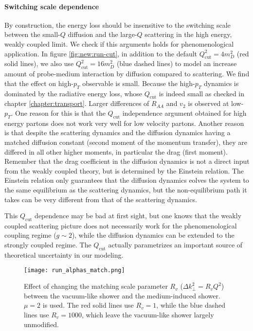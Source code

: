 \paragraph{Switching scale dependence} By construction, the energy loss should be insensitive to the switching scale between the small-$Q$ diffusion and the large-$Q$ scattering in the high energy, weakly coupled limit.
We check if this arguments holds for phenomenological application.
In figure \ref{fig:new:run-cut}, in addition to the default $Q_\textrm{cut}^2 = 4 m_D^2$ (red solid lines), we also use $Q_\textrm{cut}^2 = 16 m_D^2$ (blue dashed lines) to model an increase amount of probe-medium interaction by diffusion compared to scattering.
We find that the effect on high-$p_T$ observable is small.
Because the high-$p_T$ dynamics is dominated by the radiative energy loss, whose $Q_\textrm{cut}$ is indeed small as checked in chapter \ref{chapter:transport}.
Larger differences of $R_{AA}$ and $v_2$ is observed at low-$p_T$.
One reason for this is that the $Q_\textrm{cut}$ independence argument obtained for high energy partons does not work very well for low velocity partons.
Another reason is that despite the scattering dynamics and the diffusion dynamics having a matched diffusion constant (second moment of the momentum transfer), they are differed in all other higher moments, in particular the drag (first moment).
Remember that the drag coefficient in the diffusion dynamics is not a direct input from the weakly coupled theory, but is determined by the Einstein relation.
The Einstein relation only guarantees that the diffusion dynamics eolves the system to the same equilibrium as the scattering dynamics, but the non-equilibrium path it takes can be very different from that of the scattering dynamics.

This $Q_\textrm{cut}$ dependence may be bad at first sight, but one knows that the weakly coupled scattering picture does not necessarily work for the phenomenological coupling regime ($g\sim 2$), while the diffusion dynamics can be extended to the strongly coupled regime.
The $Q_\textrm{cut}$ actually parametrizes an important source of theoretical uncertainty in our modeling.

\begin{figure}
\singlespacing
\centering
\texttt{[image: run\_alphas\_match.png]}
\caption[Effect of changing the matching scale parameter $R_v$]{Effect of changing the matching scale parameter $R_v$ ($\Delta k_\perp^2 = R_v Q^2$) between the vacuum-like shower and the medium-induced shower. $\mu=2$ is used. The red solid lines use $R_v =1$, while the blue dashed lines use $R_v = 1000$, which leave the vacuum-like shower largely unmodified.}
\label{fig:new:run-match}
\end{figure}

